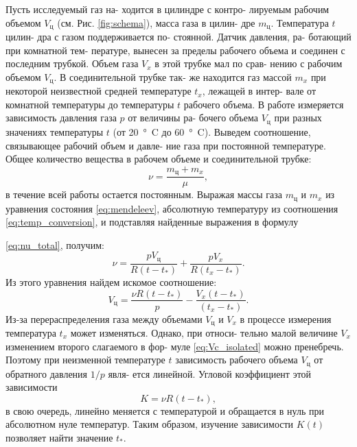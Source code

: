 \documentclass[12pt]{article}
\begin{document}
\setlength{\parindent}{1.5em} %
Пусть исследуемый газ на-
ходится в цилиндре с контро- %
лируемым рабочим объемом $V_{\text{ц}}$
(см. Рис. \ref{fig:schema}), масса газа в цилин-
дре $m_{\text{ц}}$. Температура $t$ цилин-
дра с газом поддерживается по-
стоянной. Датчик давления, ра-
ботающий при комнатной тем-
пературе, вынесен за пределы
рабочего объема и соединен с
последним трубкой. Объем газа
$V_x$ в этой трубке мал по срав-
нению с рабочим объемом $V_{\text{ц}}$.
В соединительной трубке так-
же находится газ массой $m_{x}$ при
некоторой неизвестной средней температуре $t_{x}$, лежащей в интер-
вале от комнатной температуры до температуры $t$ рабочего объема.
В работе измеряется зависимость давления газа $p$ от величины ра-
бочего объема $V_{\text{ц}}$ при разных значениях температуры $t$ (от \SI{20}{\degree C} до %
\SI{60}{\degree C}). Выведем соотношение, связывающее рабочий объем и давле- %
ние газа при постоянной температуре. Общее количество вещества
в рабочем объеме и соединительной трубке:
\begin{equation} \label{eq:nu_total}
\nu = \frac{m_{\text{ц}} + m_{x}}{\mu} ,
\end{equation}
в течение всей работы остается постоянным. Выражая массы газа
$m_{\text{ц}}$ и $m_{x}$ из уравнения состояния \eqref{eq:mendeleev}, абсолютную температуру из %
соотношения \eqref{eq:temp_conversion}, и подставляя найденные выражения в формулу

\vfill

\newpage
\vspace{1em} %

\eqref{eq:nu_total}, получим:
\begin{equation} \label{eq:nu_expanded}
\nu = \frac{pV_{\text{ц}}}{R(t-t_{*})} + \frac{pV_x}{R(t_{x} - t_{*})}.
\end{equation}
Из этого уравнения найдем искомое соотношение:
\begin{equation} \label{eq:Vc_isolated}
V_{\text{ц}} = \frac{\nu R(t-t_{*})}{p} - \frac{V_x(t-t_{*})}{(t_{x}-t_{*})}.
\end{equation}
Из-за перераспределения газа между объемами $V_{\text{ц}}$ и $V_x$ в процессе
измерения температура $t_{x}$ может изменяться. Однако, при относи-
тельно малой величине $V_x$ изменением второго слагаемого в фор-
муле \eqref{eq:Vc_isolated} можно пренебречь. Поэтому при неизменной температуре
$t$ зависимость рабочего объема $V_{\text{ц}}$ от обратного давления $1/p$ явля-
ется линейной. Угловой коэффициент этой зависимости
\begin{equation} \label{eq:K_def}
K = \nu R(t - t_{*}),
\end{equation}
в свою очередь, линейно меняется с температурой и обращается в
нуль при абсолютном нуле температур. Таким образом, изучение
зависимости $K(t)$ позволяет найти значение $t_{*}$.
\end{document}
